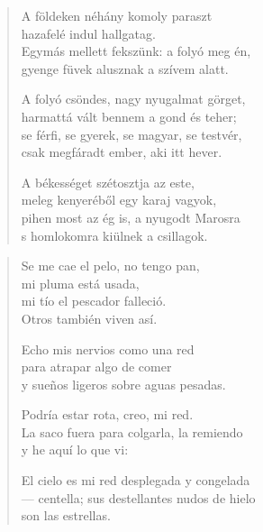 \documentclass[11pt]{book}
\newcommand*{\centeredornament}{\centerline{\pgfornament[width=6cm]{88}}}
\begin{document}
\newpage

\vspace*{-15mm}
\centeredornament



\begin{verse}
  A földeken néhány komoly paraszt \\
  hazafelé indul hallgatag. \\
  Egymás mellett fekszünk: a folyó meg én, \\
  gyenge füvek alusznak a szívem alatt.

  A folyó csöndes, nagy nyugalmat görget, \\
  harmattá vált bennem a gond és teher; \\
  se férfi, se gyerek, se magyar, se testvér, \\
  csak megfáradt ember, aki itt hever.

  A békességet szétosztja az este, \\
  meleg kenyeréből egy karaj vagyok, \\
  pihen most az ég is, a nyugodt Marosra \\
  s homlokomra kiülnek a csillagok.
\end{verse}

\newpage

\vspace*{-15mm}
\centeredornament



\begin{verse}
  Se me cae el pelo, no tengo pan, \\
  mi pluma está usada, \\
  mi tío el pescador falleció. \\
  Otros también viven así.

  Echo mis nervios como una red \\
  para atrapar algo de comer \\
  y sueños ligeros sobre aguas pesadas.

  Podría estar rota, creo, mi red. \\
  La saco fuera para colgarla, la remiendo \\
  y he aquí lo que vi:

  El cielo es mi red desplegada y congelada \\
  --- centella; sus destellantes nudos de hielo \\
  son las estrellas.
\end{verse}
\end{document}
